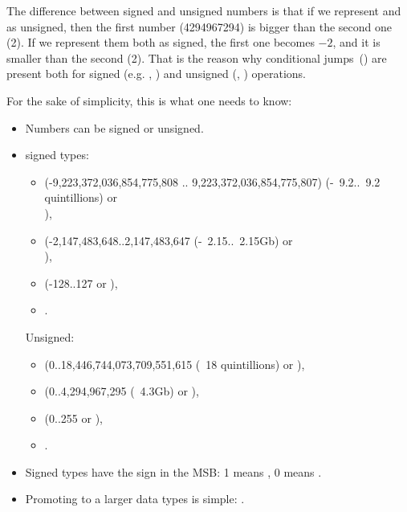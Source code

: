 The difference between signed and unsigned numbers is that if we represent  and  
as unsigned, then the first number (4294967294) is bigger than the second one (2). 
If we represent them both as signed, the first one becomes $-2$, and it is smaller than the second (2). 
That is the reason why conditional jumps~() are present both for signed (e.g. \JG, \JL) 
and unsigned (\JA, \JB) operations.

For the sake of simplicity, this is what one needs to know:

\begin{itemize}
\item Numbers can be signed or unsigned.

\item \CCpp signed types:

  \begin{itemize}
    \item {} (-9,223,372,036,854,775,808 .. 9,223,372,036,854,775,807)
	  (-~9.2..~9.2 quintillions) or \\
                ),
    \item \Tint (-2,147,483,648..2,147,483,647 (-~2.15..~2.15Gb) or \\
	    ),
    \item \Tchar (-128..127 or ),
    \item {}.
   \end{itemize}

	Unsigned:
  \begin{itemize}
	  \item {} (0..18,446,744,073,709,551,615 
		  (~18 quintillions) or ),
   \item {} (0..4,294,967,295 (~4.3Gb) or ),
   \item {} (0..255 or ), 
   \item {}.
  \end{itemize}

\item Signed types have the sign in the \ac{MSB}: 1 means , 0 means .

\item Promoting to a larger data types is simple:
.


\end{itemize}
